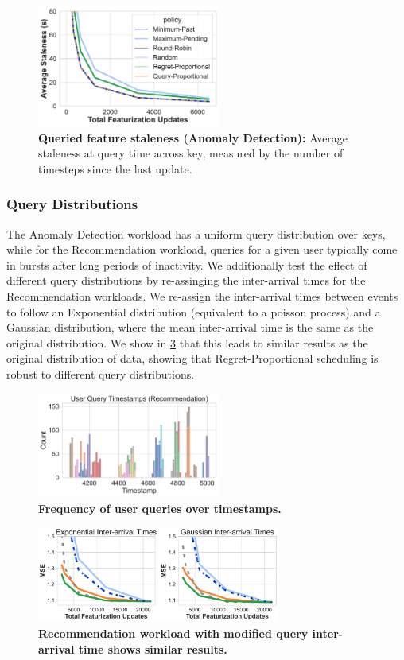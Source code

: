 \begin{figure}
    \centering
    \includegraphics[width=6cm]{ralf/figures/yahoo_a1_results_line_staleness.pdf}
    \caption{\textbf{Queried feature staleness (Anomaly Detection):} Average staleness at query time across key, measured by the number of timesteps since the last update.}
    \label{fig:stl-yahoo-staleness}
\end{figure}

\subsubsection{Query Distributions} 
The Anomaly Detection workload has a uniform query distribution over keys, while for the Recommendation workload, queries for a given user typically come in bursts after long periods of inactivity. We additionally test the effect of different query distributions by re-assinging the inter-arrival times for the Recommendation workloads. We re-assign the inter-arrival times between events to follow an Exponential distribution (equivalent to a poisson process) and a Gaussian distribution, where the mean inter-arrival time is the same as the original distribution. We show in \cref{fig:als-dist} that this leads to similar results as the original distribution of data, showing that Regret-Proportional scheduling is robust to different query distributions. 

\begin{figure}[t]
     \centering
    \includegraphics[width=6cm]{ralf/figures/als_user_dist.pdf}
    \caption{\textbf{Frequency of user queries over timestamps.}}
    \label{fig:als-user-dist} 
\end{figure}

\begin{figure}[t]
     \centering
    \includegraphics[width=8cm]{ralf/figures/als_dist.pdf}
    \caption{\textbf{Recommendation workload with modified query inter-arrival time shows similar results.}}
    \label{fig:als-dist} 
\end{figure}



